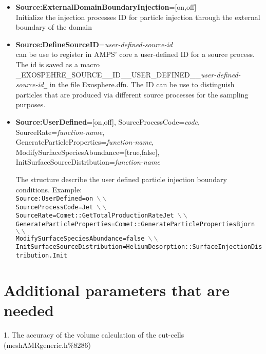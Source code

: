 \begin{itemize}
\item {\bf Source:ExternalDomainBoundaryInjection}=[on,off] \\ Initialize the injection processes ID for particle injection through the external boundary of the domain

\item{\bf Source:DefineSourceID}={\it user-defined-source-id} \\ can be use to register in AMPS' core a user-defined ID for a source process. The id is saved as a macro \_EXOSPEHRE\_SOURCE\_\_ID\_\_USER\_DEFINED\_\_{\it user-defined-source-id}{\tt \_} in the file Exosphere.dfn. The ID can be use to distinguish particles that are produced via different source processes for the sampling purposes.



\item {\bf Source:UserDefined}=[on,off], SourceProcessCode={\it code}, SourceRate={\it function-name}, \\ GenerateParticleProperties={\it function-name}, ModifySurfaceSpeciesAbundance=[true,false], \\ InitSurfaceSourceDistribution={\it function-name} 

The structure describe the user defined particle injection boundary conditions. Example: \\ {\tt Source:UserDefined=on $\backslash\backslash$ \\ SourceProcessCode=Jet $\backslash\backslash$ \\ SourceRate=Comet::GetTotalProductionRateJet $\backslash\backslash$ \\ GenerateParticleProperties=Comet::GenerateParticlePropertiesBjorn $\backslash\backslash$ \\ ModifySurfaceSpeciesAbundance=false  $\backslash\backslash$ \\ InitSurfaceSourceDistribution=HeliumDesorption::SurfaceInjectionDistribution.Init}



\end{itemize}











     

\section{Additional parameters that are needed} 
1. The accuracy of the volume calculation of the cut-cells (meshAMRgeneric.h\%8286)








